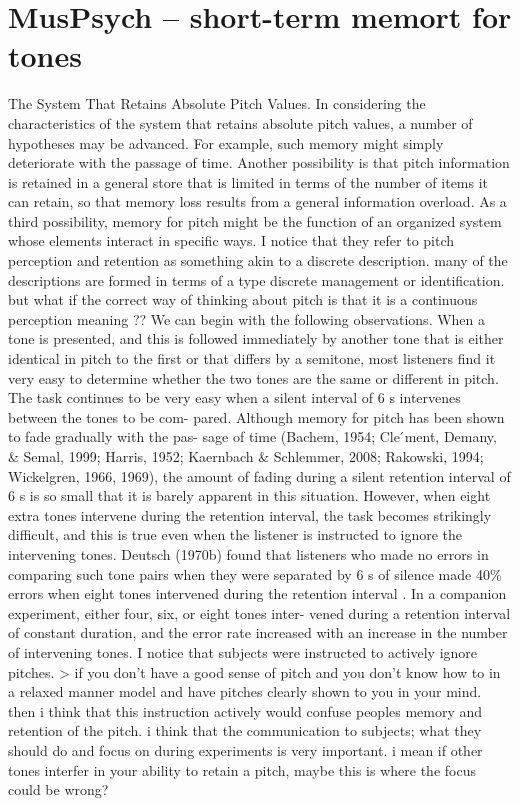 \section{MusPsych – short-term memort for tones}

The System That Retains Absolute Pitch Values. In considering the characteristics of the system that retains absolute pitch values, a number of hypotheses may be advanced. For example, such memory might simply deteriorate with the passage of time. Another possibility is that pitch information is retained in a general store that is limited in terms of the number of items it can retain, so that memory loss results from a general information overload. As a third possibility, memory for pitch might be the function of an organized system whose elements interact in specific ways. I notice that they refer to pitch perception and retention as something akin to a discrete description. many of the descriptions are formed in terms of a type discrete management or identification. but what if the correct way of thinking about pitch is that it is a continuous perception meaning ?? We can begin with the following observations. When a tone is presented, and this is followed immediately by another tone that is either identical in pitch to the first or that differs by a semitone, most listeners find it very easy to determine whether the two tones are the same or different in pitch. The task continues to be very easy when a silent interval of 6 s intervenes between the tones to be com- pared. Although memory for pitch has been shown to fade gradually with the pas- sage of time \cite{bachem1954time} \cite{clement1999memory} \cite{harris1952decline} \cite{kaernbach2008decay} \cite{rakowski1994investigating} \cite{wickelgren1969associative} (Bachem, 1954; Cle ́ment, Demany, & Semal, 1999; Harris, 1952; Kaernbach & Schlemmer, 2008; Rakowski, 1994; Wickelgren, 1966, 1969), the amount of fading during a silent retention interval of 6 s is so small that it is barely apparent in this situation. However, when eight extra tones intervene during the retention interval, the task becomes strikingly difficult, and this is true even when the listener is instructed to ignore the intervening tones. Deutsch (1970b) found that listeners who made no errors in comparing such tone pairs when they were separated by 6 s of silence made 40\% errors when eight tones intervened during the retention interval \cite{deutsch1970deterioration}. In a companion experiment, either four, six, or eight tones inter- vened during a retention interval of constant duration, and the error rate increased with an increase in the number of intervening tones. I notice that subjects were instructed to actively ignore pitches. > if you don't have a good sense of pitch and you don't know how to in a relaxed manner model and have pitches clearly shown to you in your mind. then i think that this instruction actively would confuse peoples memory and retention of the pitch. i think that the communication to subjects; what they should do and focus on during experiments is very important. i mean if other tones interfer in your ability to retain a pitch, maybe this is where the focus could be wrong?
